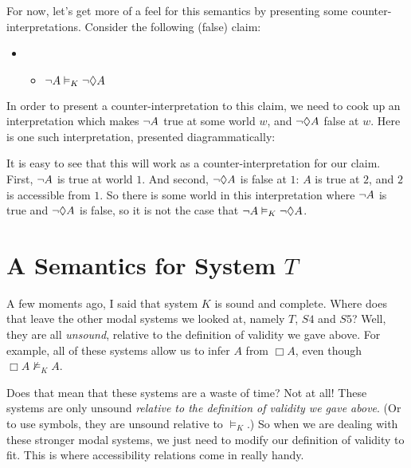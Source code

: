 For now, let's get more of a feel for this semantics by presenting some counter-interpretations. Consider the following (false) claim:
\begin{itemize}
\item[]
\begin{itemize}
\item[]$\neg A\vDash_K \neg \Diamond A$
\end{itemize}
\end{itemize}
In order to present a counter-interpretation to this claim, we need to cook up an interpretation which makes $\neg A$ true at some world $w$, and $\neg\Diamond A$ false at $w$. Here is one such interpretation, presented diagrammatically:
\begin{center}
\end{center}
It is easy to see that this will work as a counter-interpretation for our claim. First, $\neg A$ is true at world $1$. And second, $\neg\Diamond A$ is false at $1$: $A$ is true at $2$, and $2$ is accessible from $1$. So there is some world in this interpretation where $\neg A$ is true and $\neg\Diamond A$ is false, so it is not the case that $\neg A\vDash_K\neg\Diamond A$.


\section{A Semantics for System $T$}
\label{SemanticsT}

A few moments ago, I said that system $K$ is sound and complete. Where does that leave the other modal systems we looked at, namely $T$, $S4$ and $S5$? Well, they are all \emph{unsound}, relative to the definition of validity we gave above. For example, all of these systems allow us to infer $A$ from $\Box A$, even though $\Box A\nvDash_K A$.

Does that mean that these systems are a waste of time? Not at all! These systems are only unsound \emph{relative to the definition of validity we gave above}. (Or to use symbols, they are unsound relative to $\vDash_K$.) So when we are dealing with these stronger modal systems, we just need to modify our definition of validity to fit. This is where accessibility relations come in really handy.

